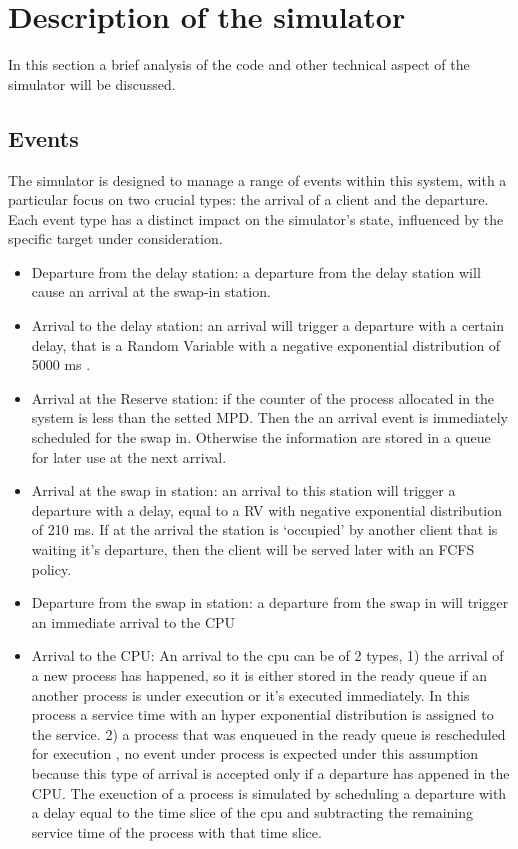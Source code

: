 \documentclass[12pt,a4paper]{article}
\begin{document}
	
	
	\section{Description of the simulator}
    In this section a brief analysis of the code and other technical aspect of the simulator will be discussed.
    \subsection{Events}
    The simulator is designed to manage a range of events within this system, with a particular focus on two crucial types: the arrival of a client and the departure. Each event type has a distinct impact on the simulator's state, influenced by the specific target under consideration. 
    \begin{itemize}
        \item Departure from the delay station: a departure from the delay station will cause an arrival at the swap-in station.
        \item Arrival to the delay station: an arrival will trigger a departure with a certain delay, that is a Random Variable with a negative exponential distribution of 5000 ms .
        \item Arrival at the Reserve station: if the counter of the process allocated in the system is less than the setted MPD. Then the an arrival event is immediately scheduled for the swap in. Otherwise the information are stored in a queue for later use at the next arrival.
        \item Arrival at the swap in station: an arrival to this station will trigger a departure with a delay, equal to a RV with negative exponential distribution of 210 ms. If at the arrival the station is `occupied' by another client that is waiting it's departure, then the client will be served later with an FCFS policy.
        \item Departure from the swap in station: a departure from the swap in will trigger an immediate arrival to the CPU 
        \item Arrival to the CPU: An arrival to the cpu can be of 2 types, 1) the arrival of a new process has happened, so it is either stored in the ready queue if an another process is under execution or it's executed immediately. In this process a service time with an hyper exponential distribution is assigned to the service. 2) a process that was enqueued in the ready queue is rescheduled for execution , no event under process is expected under this assumption because this type of arrival is accepted only if a departure has appened in the CPU. The exeuction of a process is simulated by scheduling a departure with a delay equal to the time slice of the cpu and subtracting the remaining service time of the process with that time slice.

\end{itemize}
\end{document}
